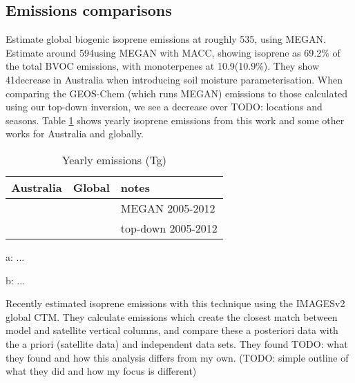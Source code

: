       
      
  \subsection{Emissions comparisons}
    \label{BioIsop:Results:Emissions}
    
    \textcite{Guenther2012} Estimate global biogenic isoprene emissions at roughly 535\tgpyr, using MEGAN.
    \textcite{Sindelarova2014} Estimate around 594\tgpyr using MEGAN with MACC, showing isoprene as 69.2\% of the total BVOC emissions, with monoterpenes at 10.9\tgpyr (10.9\%).
    They show 41\tgpyr decrease in Australia when introducing soil moisture parameterisation.
    When comparing the GEOS-Chem (which runs MEGAN) emissions to those calculated using our top-down inversion, we see a decrease over TODO: locations and seasons.
    Table \ref{BioIsop:Results:Emissions:tab_emissions_Tg} shows yearly isoprene emissions from this work and some other works for Australia and globally.
    
    \begin{table}\begin{threeparttable}
      \caption{Yearly emissions (Tg)}
      \begin{tabular}{ l  c  l } 
        \toprule
        Australia & Global & notes \\
        \midrule
        &  & MEGAN 2005-2012 \\
        &  & top-down 2005-2012 \\
        \bottomrule
      \end{tabular}
      \begin{tablenotes} 
        \item a: ...%
        \item b: ...
      \end{tablenotes}
      \label{BioIsop:Results:Emissions:tab_emissions_Tg}
    \end{threeparttable}\end{table}
    
    Recently \textcite{Bauwens2016} estimated isoprene emissions with this technique using the IMAGESv2 global CTM.
    They calculate emissions which create the closest match between model and satellite vertical columns, and compare these a posteriori data with the a priori (satellite data) and independent data sets.
    They found TODO: what they found and how this analysis differs from my own.
    (TODO: simple outline of what they did and how my focus is different)
    

